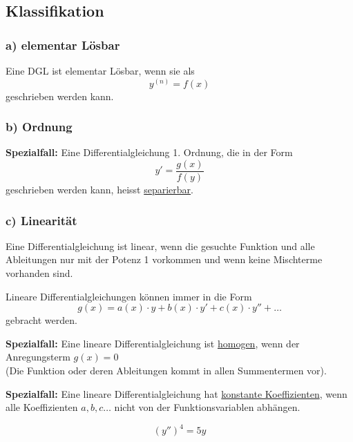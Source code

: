 \subsection{Klassifikation}
\subsubsection*{a) elementar Lösbar}
Eine DGL ist elementar Lösbar, wenn sie als 
\begin{equation*}
    y^{\left( n \right)} = f(x)
\end{equation*}
geschrieben werden kann.

\subsubsection*{b) Ordnung}

\textbf{Spezialfall:} Eine Differentialgleichung 1. Ordnung, die in der Form 
\begin{equation*}
    y' = \frac{g(x)}{f(y)}
\end{equation*}
geschrieben werden kann, heisst \underline{separierbar}.

\subsubsection*{c) Linearität}
Eine Differentialgleichung ist linear, wenn die gesuchte Funktion und alle
Ab\-lei\-tun\-gen nur mit der Potenz 1 vorkommen und wenn keine Mischterme vorhanden
sind.

Lineare Differentialgleichungen können immer in die Form 
\begin{equation*}
    g(x) = a(x)\cdot y + b(x) \cdot y' + c(x)\cdot y'' + \ldots
\end{equation*}
gebracht werden.

\textbf{Spezialfall:} Eine lineare Differentialgleichung ist
\underline{homogen}, wenn der Anregungsterm $g(x)=0$ \\
(Die Funktion oder deren Ableitungen kommt in allen Summentermen vor).

\textbf{Spezialfall:} Eine lineare Differentialgleichung hat \underline{%
konstante Koeffizienten}, wenn alle Koeffizienten $a,b,c\ldots$ nicht von der
Funktionsvariablen abhängen.

\begin{equation*}
    \left( y'' \right)^{4} = 5y%
\end{equation*}

